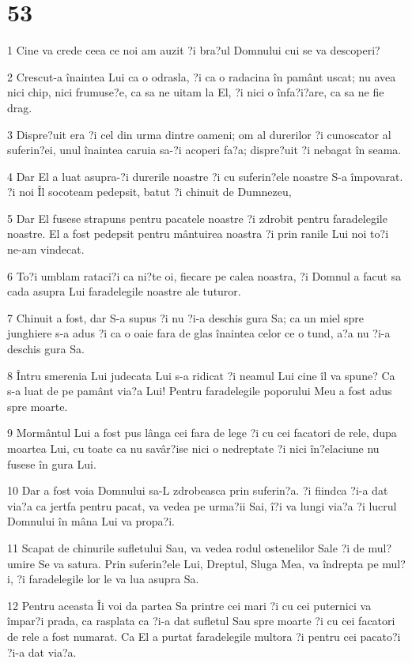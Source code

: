 \chapter{53}

\par 1 Cine va crede ceea ce noi am auzit ?i bra?ul Domnului cui se va descoperi?
\par 2 Crescut-a înaintea Lui ca o odrasla, ?i ca o radacina în pamânt uscat; nu avea nici chip, nici frumuse?e, ca sa ne uitam la El, ?i nici o înfa?i?are, ca sa ne fie drag.
\par 3 Dispre?uit era ?i cel din urma dintre oameni; om al durerilor ?i cunoscator al suferin?ei, unul înaintea caruia sa-?i acoperi fa?a; dispre?uit ?i nebagat în seama.
\par 4 Dar El a luat asupra-?i durerile noastre ?i cu suferin?ele noastre S-a împovarat. ?i noi Îl socoteam pedepsit, batut ?i chinuit de Dumnezeu,
\par 5 Dar El fusese strapuns pentru pacatele noastre ?i zdrobit pentru faradelegile noastre. El a fost pedepsit pentru mântuirea noastra ?i prin ranile Lui noi to?i ne-am vindecat.
\par 6 To?i umblam rataci?i ca ni?te oi, fiecare pe calea noastra, ?i Domnul a facut sa cada asupra Lui faradelegile noastre ale tuturor.
\par 7 Chinuit a fost, dar S-a supus ?i nu ?i-a deschis gura Sa; ca un miel spre junghiere s-a adus ?i ca o oaie fara de glas înaintea celor ce o tund, a?a nu ?i-a deschis gura Sa.
\par 8 Întru smerenia Lui judecata Lui s-a ridicat ?i neamul Lui cine îl va spune? Ca s-a luat de pe pamânt via?a Lui! Pentru faradelegile poporului Meu a fost adus spre moarte.
\par 9 Mormântul Lui a fost pus lânga cei fara de lege ?i cu cei facatori de rele, dupa moartea Lui, cu toate ca nu savâr?ise nici o nedreptate ?i nici în?elaciune nu fusese în gura Lui.
\par 10 Dar a fost voia Domnului sa-L zdrobeasca prin suferin?a. ?i fiindca ?i-a dat via?a ca jertfa pentru pacat, va vedea pe urma?ii Sai, î?i va lungi via?a ?i lucrul Domnului în mâna Lui va propa?i.
\par 11 Scapat de chinurile sufletului Sau, va vedea rodul ostenelilor Sale ?i de mul?umire Se va satura. Prin suferin?ele Lui, Dreptul, Sluga Mea, va îndrepta pe mul?i, ?i faradelegile lor le va lua asupra Sa.
\par 12 Pentru aceasta Îi voi da partea Sa printre cei mari ?i cu cei puternici va împar?i prada, ca rasplata ca ?i-a dat sufletul Sau spre moarte ?i cu cei facatori de rele a fost numarat. Ca El a purtat faradelegile multora ?i pentru cei pacato?i ?i-a dat via?a.

